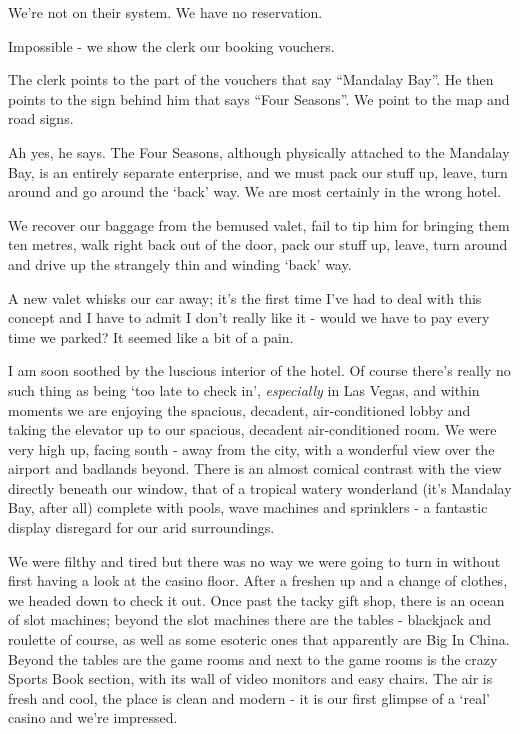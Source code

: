 \documentclass[a5paper,titlepage,11pt]{book}
\begin{document}
We're not on their system. We have no reservation.

Impossible - we show the clerk our booking vouchers.

The clerk points to the part of the vouchers that say ``Mandalay Bay''. He then points to the sign behind him that says ``Four Seasons''. We point to the map and road signs.

Ah yes, he says. The Four Seasons, although physically attached to the Mandalay Bay, is an entirely separate enterprise, and we must pack our stuff up, leave, turn around and go around the `back' way. We are most certainly in the wrong hotel.

We recover our baggage from the bemused valet, fail to tip him for bringing them ten metres, walk right back out of the door, pack our stuff up, leave, turn around and drive up the strangely thin and winding `back' way.

A new valet whisks our car away; it's the first time I've had to deal with this concept and I have to admit I don't really like it - would we have to pay every time we parked?  It seemed like a bit of a pain.

I am soon soothed by the luscious interior of the hotel. Of course there's really no such thing as being `too late to check in', \emph{especially} in Las Vegas, and within moments we are enjoying the spacious, decadent, air-conditioned lobby and taking the elevator up to our spacious, decadent air-conditioned room. We were very high up, facing south - away from the city, with a wonderful view over the airport and badlands beyond. There is an almost comical contrast with the view directly beneath our window, that of a tropical watery wonderland (it's Mandalay Bay, after all) complete with pools, wave machines and sprinklers - a fantastic display disregard for our arid surroundings.

We were filthy and tired but there was no way we were going to turn in without first having a look at the casino floor. After a freshen up and a change of clothes, we headed down to check it out. Once past the tacky gift shop, there is an ocean of slot machines; beyond the slot machines there are the tables - blackjack and roulette of course, as well as some esoteric ones that apparently are Big In China. Beyond the tables are the game rooms and next to the game rooms is the crazy Sports Book section, with its wall of video monitors and easy chairs. The air is fresh and cool, the place is clean and modern - it is our first glimpse of a `real' casino and we're impressed.
\end{document}
